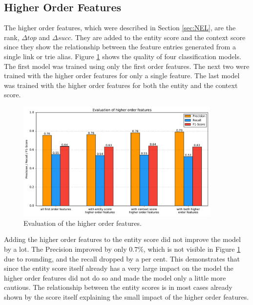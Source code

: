 \subsection{Higher Order Features}
The higher order features, which were described in Section \ref{sec:NEL}, are the rank, $\Delta top$ and $\Delta succ$. They are added to the entity score and the context score since they show the relationship between the feature entries generated from a single link or trie alias. Figure \ref{ho_eval_gen} shows the quality of four classification models. The first model was trained using only the first order features. The next two were trained with the higher order features for only a single feature. The last model was trained with the higher order features for both the entity and the context score.\par
\begin{figure}[H]
	\centering
	\includegraphics[width=0.9\textwidth]{img/higher_order_eval}
	\caption{Evaluation of the higher order features.}
	\label{ho_eval_gen}
\end{figure}
Adding the higher order features to the entity score did not improve the model by a lot. The Precision improved by only $0.7\%$, which is not visible in Figure \ref{ho_eval_gen} due to rounding, and the recall dropped by a per cent. This demonstrates that since the entity score itself already has a very large impact on the model the higher order features did not do so and made the model only a little more cautious. The relationship between the entity scores is in most cases already shown by the score itself explaining the small impact of the higher order features.\par
